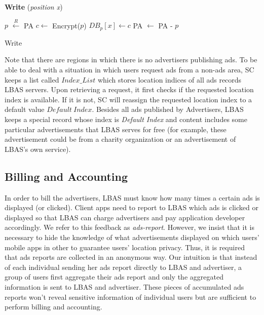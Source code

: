 \begin{algorithm}
\hrulefill
\vspace{-5pt}

 \textbf{Write }(\textit{position x})\\
 \vspace{-10pt}
\hrulefill

 $p$  $\xleftarrow{R}$ PA\;
 $c \gets$ Encrypt($p$) \;
 $DB_p[x] \gets c$\;
 PA $\gets$ PA - $p$\;
\vspace{-8pt} 
\hrulefill

\caption{Write}
\end{algorithm}
 

Note that there are regions in which there is no advertisers publishing ads. To be able to deal with a situation in which users request ads from a non-ads area, SC keeps a list called $Index\_List$ which stores location indices of all ads records LBAS servers. Upon retrieving a request, it first checks if the requested location index is available. If it is not, SC will reassign the requested location index to a default value $Default\ Index$. Besides all ads published by Advertisers, LBAS keeps a special record whose index is \textit{Default Index} and content includes some particular advertisements that LBAS serves for free (for example, these advertisement could be from a charity organization or an advertisement of LBAS's own service).


\subsection{Billing and Accounting} 
\label{subsec:billing}

In order to bill the advertisers, LBAS must know how many times a certain ads is displayed (or clicked). Client apps need to report to LBAS which ads is clicked or displayed so that LBAS can charge advertisers and pay application developer accordingly. We refer to this feedback as \textit{ads-report}. However, we insist that it is necessary to hide the knowledge of what advertisements displayed on which users' mobile apps in other to guarantee users' location privacy. Thus, it is required that ads reports are collected in an anonymous way. Our intuition is that instead of each individual sending her ads report directly to LBAS and advertiser, a group of users first aggregate their ads report and only the aggregated information is sent to LBAS and advertiser. These pieces of accumulated ads reports won't reveal sensitive information of individual users but are sufficient to perform billing and accounting.

